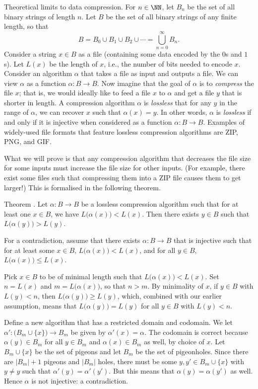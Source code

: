 \medskip\boldlabel Theoretical limits to data compression. For $n\in \NN$, let $B_n$ be the set of all
binary strings of length $n$. Let $B$ be the set of all binary strings of any finite length,
so that
$$B = B_0 \cup B_1 \cup B_2 \cup \cdots =  \bigcup_{n=0}^\infty B_n.$$
Consider a string $x\in B$ as a file (containing some data encoded by the $0$s and $1$s).
Let $L(x)$ be the length of $x$, i.e., the number
of bits needed to encode $x$. Consider an algorithm $\alpha$ that takes a file as input and
outputs a file. We can view $\alpha$ as a function $\alpha : B\to B$. Now imagine that the goal
of $\alpha$ is to {\it compress} the file $x$; that is, we would ideally like to feed
a file $x$ to $\alpha$ and get a file $y$ that is shorter in length.
A compression algorithm $\alpha$ is {\it lossless} that for any $y$ in the range of $\alpha$,
we can recover $x$ such that $\alpha(x) = y$. In other words, $\alpha$ is {\it lossless}
if and only if it is injective when considered as a function $\alpha : B\to B$.
Examples of widely-used file formats that feature lossless compression algorithms are
{\mc ZIP}, {\mc PNG}, and {\mc GIF}.

What we will prove is that any compression algorithm that decreases the file size for some inputs
must increase the file size for other inputs. (For example, there exist some files such that
compressing them into a {\mc ZIP} file causes them to get larger!)
This is formalised in the following theorem.

\proclaim Theorem \advthm. Let $\alpha : B\to B$ be a lossless compression algorithm such
that for at least one $x\in B$, we have $L\bigl(\alpha(x)\bigr) < L(x)$.
Then there exists $y\in B$ such that $L\bigl(\alpha(y)\bigr) > L(y)$.

\proof For a contradiction, assume that there exists $\alpha: B\to B$ that is injective
such that for at least some $x\in B$, $L\bigl(\alpha(x)\bigr) < L(x)$, and for all
$y\in B$, $L\bigl(\alpha(x)\bigr) \le L(x)$.

Pick $x\in B$ to be of minimal length such that
$L\bigl(\alpha(x)\bigr) < L(x)$. Set $n = L(x)$ and $m = L\bigl(\alpha(x)\bigr)$, so that
$n>m$. By minimality of $x$, if $y\in B$ with $L(y)<n$, then $L\bigl(\alpha(y)\bigr) \ge L(y)$,
which, combined with our earlier assumption, means that
$L\bigl(\alpha(y)\bigr) = L(y)$ for all $y\in B$ with $L(y)<n$.

Define a new algorithm that has a restricted domain and codomain. We let
$\alpha' : \bigl(B_m \cup \{x\}\bigr) \to B_m$ be given by $\alpha'(x) = \alpha$.
The codomain is correct because $\alpha(y) \in B_m$ for all $y\in B_m$ and $\alpha(x)\in B_m$
as well, by choice of $x$. Let $B_m\cup\{x\}$ be the set of pigeons and let $B_m$
be the set of pigeonholes. Since there are $|B_m|+1$ pigeons and $|B_m|$ holes, there must
be some $y,y'\in B_m\cup\{x\}$ with $y\ne y$ such that $\alpha'(y) = \alpha'(y')$. But this
means that $\alpha(y) = \alpha(y')$ as well. Hence $\alpha$ is not injective: a contradiction.\slug

